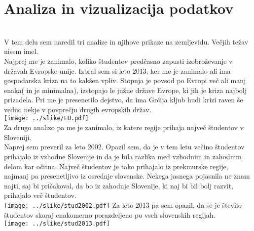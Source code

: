 \documentclass[11pt,a4paper]{article}
\begin{document}
\section{Analiza in vizualizacija podatkov} \\
V tem delu sem naredil tri analize in njihove prikaze na zemljevidu. Večjih težav nisem imel. \\
Najprej me je zanimalo, koliko študentov predčasno zapusti izobroževanje v državah Evropske unije. Izbral sem si leto 2013, ker me je zanimalo ali ima gospodarska kriza na to kakšen vpliv. Stopnja je povsod po Evropi več ali manj enaka( in je minimalna), izstopajo le južne države Evrope, ki jih je kriza najbolj prizadela. Pri me je presenetilo dejstvo, da ima Grčija kljub hudi krizi raven še vedno nekje v povprečju drugih evropskih držav. \\
\texttt{[image: ../slike/EU.pdf]}\\
Za drugo analizo pa me je zanimalo, iz katere regije prihaja največ študentov v Sloveniji. \\
Naprej sem preveril za leto 2002. Opazil sem, da je v tem letu večino študentov prihajalo iz vzhodne Slovenije in da je bila razlika med vzhodnim in zahodnim delom kar očitna. Največ študentov je tako prihajalo iz prekmurske regije, najmanj pa presenetljivo iz osrednje slovenske. Nekega jasnega pojasnila ne znam najti, saj bi pričakoval, da bo iz zahodnje Slovenije, ki naj bi bil bolj razvit, prihajalo več študentov. \\

\texttt{[image: ../slike/stud2002.pdf]}
 Za leto 2013 pa sem opazil, da se je število študentov skoraj enakomerno porazdeljeno po vseh slovenskih regijah. \\
\texttt{[image: ../slike/stud2013.pdf]} 
\end{document}
